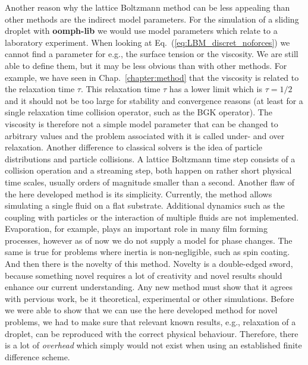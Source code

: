 Another reason why the lattice Boltzmann method can be less appealing than other methods are the indirect model parameters.
For the simulation of a sliding droplet with \textbf{oomph-lib} we would use model parameters which relate to a laboratory experiment.
When looking at Eq.~(\ref{eq:LBM_discret_noforces}) we cannot find a parameter for e.g., the surface tension or the viscosity. 
We are still able to define them, but it may be less obvious than with other methods.
For example, we have seen in Chap.~\ref{chapter:method} that the viscosity is related to the relaxation time $\tau$. 
This relaxation time $\tau$ has a lower limit which is $\tau = 1/2$ and it should not be too large for stability and convergence reasons (at least for a single relaxation time collision operator, such as the BGK operator).
The viscosity is therefore not a simple model parameter that can be changed to arbitrary values and the problem associated with it is called under- and over relaxation.
Another difference to classical solvers is the idea of particle distributions and particle collisions.
A lattice Boltzmann time step consists of a collision operation and a streaming step, both happen on rather short physical time scales, usually orders of magnitude smaller than a second.
Another flaw of the here developed method is its simplicity.
Currently, the method allows simulating a single fluid on a flat substrate.
Additional dynamics such as the coupling with particles or the interaction of multiple fluids are not implemented.
Evaporation, for example, plays an important role in many film forming processes, however as of now we do not supply a model for phase changes.
The same is true for problems where inertia is non-negligible, such as spin coating.
And then there is the novelty of this method.
Novelty is a double-edged sword, because something novel requires a lot of creativity and novel results should enhance our current understanding.
Any new method must show that it agrees with pervious work, be it theoretical, experimental or other simulations.
Before we were able to show that we can use the here developed method for novel problems, we had to make sure that relevant known results, e.g., relaxation of a droplet, can be reproduced with the correct physical behaviour.
Therefore, there is a lot of \textit{overhead} which simply would not exist when using an established finite difference scheme.

